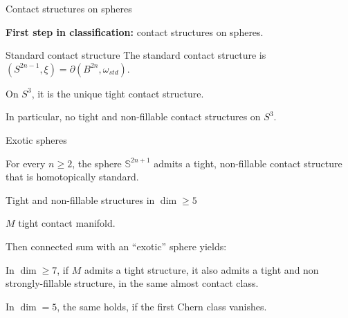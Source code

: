 \documentclass{beamer}
\begin{document}
\begin{frame}{Contact structures on spheres}

\textbf{First step in classification:} contact structures on spheres.

\begin{exampleblock}{Standard contact structure}
The standard contact structure is $(S^{2n-1},\xi)=\partial(B^{2n},\omega_{std})$.
\end{exampleblock}

\pause

\begin{theorem}[Eliashberg, '91] 
    On $S^3$, it is the unique tight contact structure.
\end{theorem} 

In particular, no tight and non-fillable contact structures on $S^3$.

    
    
    
    


\end{frame}

\begin{frame}{Exotic spheres}
    
    \begin{theorem}
        For every $n \geq 2$, the sphere $\mathbb S^{2n+1}$ admits a tight, non-fillable contact structure that is homotopically standard.
    \end{theorem}
        
\end{frame}

\begin{frame}{Tight and non-fillable structures in $\dim \geq 5$}

$M$ tight contact manifold. 

\pause 

Then connected sum with an ``exotic'' sphere yields:

\begin{theorem}
In $\dim \geq 7$, if $M$ admits a tight structure, it also admits a tight and non strongly-fillable structure, in the same almost contact class. 
\pause

\smallskip

In $\dim=5$, the same holds, if the first Chern class vanishes.
\end{theorem}

    
\end{frame}
\end{document}
